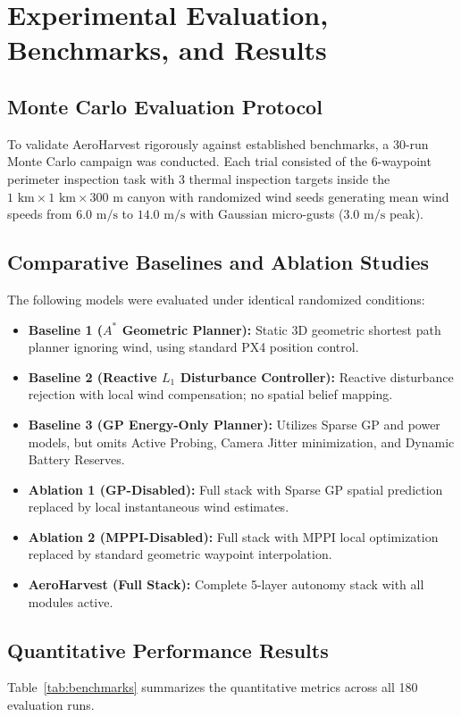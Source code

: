 \documentclass[12pt,a4paper,oneside]{report}
\begin{document}
\chapter{Experimental Evaluation, Benchmarks, and Results}

\section{Monte Carlo Evaluation Protocol}
To validate AeroHarvest rigorously against established benchmarks, a 30-run Monte Carlo campaign was conducted. Each trial consisted of the 6-waypoint perimeter inspection task with 3 thermal inspection targets inside the $1\text{ km} \times 1\text{ km} \times 300\text{ m}$ canyon with randomized wind seeds generating mean wind speeds from $6.0\text{ m/s}$ to $14.0\text{ m/s}$ with Gaussian micro-gusts ($3.0\text{ m/s}$ peak).

\section{Comparative Baselines and Ablation Studies}
The following models were evaluated under identical randomized conditions:
\begin{itemize}
    \item \textbf{Baseline 1 ($A^*$ Geometric Planner):} Static 3D geometric shortest path planner ignoring wind, using standard PX4 position control.
    \item \textbf{Baseline 2 (Reactive $L_1$ Disturbance Controller):} Reactive disturbance rejection with local wind compensation; no spatial belief mapping.
    \item \textbf{Baseline 3 (GP Energy-Only Planner):} Utilizes Sparse GP and power models, but omits Active Probing, Camera Jitter minimization, and Dynamic Battery Reserves.
    \item \textbf{Ablation 1 (GP-Disabled):} Full stack with Sparse GP spatial prediction replaced by local instantaneous wind estimates.
    \item \textbf{Ablation 2 (MPPI-Disabled):} Full stack with MPPI local optimization replaced by standard geometric waypoint interpolation.
    \item \textbf{AeroHarvest (Full Stack):} Complete 5-layer autonomy stack with all modules active.
\end{itemize}

\section{Quantitative Performance Results}
Table~\ref{tab:benchmarks} summarizes the quantitative metrics across all 180 evaluation runs.
\end{document}
